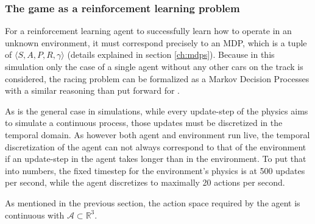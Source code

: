 \subsubsection{The game as a reinforcement learning problem}

For a reinforcement learning agent to successfully learn how to operate in an unknown environment, it must correspond precisely to an MDP, which is a tuple of $\langle S, A, P, R, \gamma \rangle$ (details explained in section \ref{ch:mdps}). Because in this simulation only the case of a single agent without any other cars on the track is considered, the racing problem can be formalized as a Markov Decision Processes with a similar reasoning than \citet[chapter 4]{wymann_torcs_2015} put forward for . 

As is the general case in simulations, while every update-step of the physics aims to simulate a continuous process, those updates must be discretized in the temporal domain. As however both agent and environment run live, the temporal discretization of the agent can not always correspond to that of the environment if an update-step in the agent takes longer than in the environment. To put that into numbers, the fixed timestep for the environment's physics is at 500 updates per second, while the agent discretizes to maximally 20 actions per second.

As mentioned in the previous section, the action space required by the agent is continuous with $\mathcal{A} \subset \mathds{R}^3$. 

